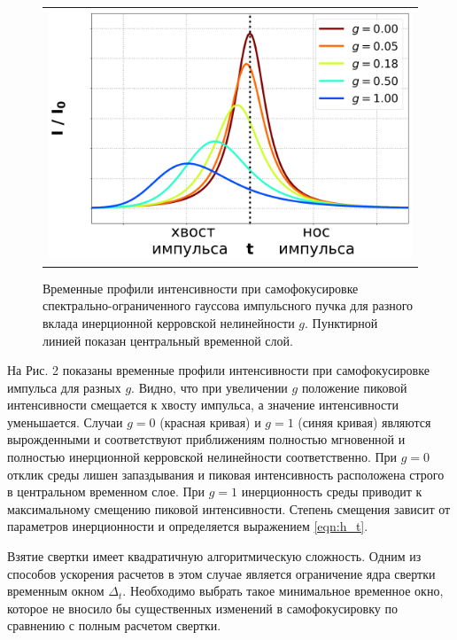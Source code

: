 \documentclass[a4paper]{article}
\begin{document}
\begin{figure}[h]
\begin{center}
\begin{tabular}{M{10cm}}
\includegraphics[width=\linewidth]{images/kerr_inertial_g.png}
\end{tabular}
\begin{minipage}{0.7\textwidth}
\caption{Временные профили интенсивности при самофокусировке спектрально-ограниченного гауссова импульсного пучка для разного вклада инерционной керровской нелинейности $g$. Пунктирной линией показан центральный временной слой.}
\end{minipage}
\label{pic:kerr_inertial_g}
\end{center}
\end{figure}

На Рис. 2 показаны временные профили интенсивности при самофокусировке импульса для разных $g$. Видно, что при увеличении $g$ положение пиковой интенсивности смещается к хвосту импульса, а значение интенсивности уменьшается. Случаи $g=0$ (красная кривая) и $g=1$ (синяя кривая) являются вырожденными и соответствуют приближениям полностью мгновенной и полностью инерционной керровской нелинейности соответственно. При $g=0$ отклик среды лишен запаздывания и пиковая интенсивность расположена строго в центральном временном слое. При $g=1$ инерционность среды приводит к максимальному смещению пиковой интенсивности. Степень смещения зависит от параметров инерционности и определяется выражением \eqref{eqn:h_t}.



Взятие свертки имеет квадратичную алгоритмическую сложность. Одним из способов ускорения расчетов в этом случае является ограничение ядра свертки временным окном $\Delta_t$. Необходимо выбрать такое минимальное временное окно, которое не вносило бы существенных изменений в самофокусировку по сравнению с полным расчетом свертки.
\end{document}
